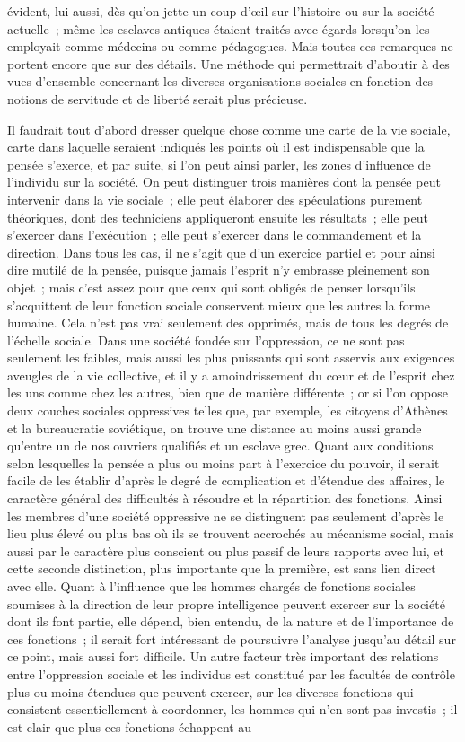 \documentclass[french,twoside]{book} %
\begin{document}
évident, lui aussi, dès qu'on jette un coup d'œil sur l'histoire ou sur la société actuelle ; même les esclaves antiques étaient traités avec égards lorsqu'on les employait comme médecins ou comme pédagogues. Mais toutes ces remarques ne portent encore que sur des détails. Une méthode qui permettrait d'aboutir à des vues d'ensemble concernant les diverses organisations sociales en fonction des notions de servitude et de liberté serait plus précieuse.\par
Il faudrait tout d'abord dresser quelque chose comme une carte de la vie sociale, carte dans laquelle seraient indiqués les points où il est indispensable que la pensée s'exerce, et par suite, si l'on peut ainsi parler, les zones d'influence de l'individu sur la société. On peut distinguer trois manières dont la pensée peut intervenir dans la vie sociale ; elle peut élaborer des spéculations purement théoriques, dont des techniciens appliqueront ensuite les résultats ; elle peut s'exercer dans l'exécution ; elle peut s'exercer dans le commandement et la direction. Dans tous les cas, il ne s'agit que d'un exercice partiel et pour ainsi dire mutilé de la pensée, puisque jamais l'esprit n'y embrasse pleinement son objet ; mais c'est assez pour que ceux qui sont obligés de penser lorsqu'ils s'acquittent de leur fonction sociale conservent mieux que les autres la forme humaine. Cela n'est pas vrai seulement des opprimés, mais de tous les degrés de l'échelle sociale. Dans une société fondée sur l'oppression, ce ne sont pas seulement les faibles, mais aussi les plus puissants qui sont asservis aux exigences aveugles de la vie collective, et il y a amoindrissement du cœur et de l'esprit chez les uns comme chez les autres, bien que de manière différente ; or si l'on oppose deux couches sociales oppressives telles que, par exemple, les citoyens d'Athènes et la bureaucratie soviétique, on trouve une distance au moins aussi grande qu'entre un de nos ouvriers qualifiés et un esclave grec. Quant aux conditions selon lesquelles la pensée a plus ou moins part à l'exercice du pouvoir, il serait facile de les établir d'après le degré de complication et d'étendue des affaires, le caractère général des difficultés à résoudre et la répartition des fonctions. Ainsi les membres d'une société oppressive ne se distinguent pas seulement d'après le lieu plus élevé ou plus bas où ils se trouvent accrochés au mécanisme social, mais aussi par le caractère plus conscient ou plus passif de leurs rapports avec lui, et cette seconde distinction, plus importante que la première, est sans lien direct avec elle. Quant à l'influence que les hommes chargés de fonctions sociales soumises à la direction de leur propre intelligence peuvent exercer sur la société dont ils font partie, elle dépend, bien entendu, de la nature et de l'importance de ces fonctions ; il serait fort intéressant de poursuivre l'analyse jusqu'au détail sur ce point, mais aussi fort difficile. Un autre facteur très important des relations entre l'oppression sociale et les individus est constitué par les facultés de contrôle plus ou moins étendues que peuvent exercer, sur les diverses fonctions qui consistent essentiellement à coordonner, les hommes qui n'en sont pas investis ; il est clair que plus ces fonctions échappent au 
\end{document}
